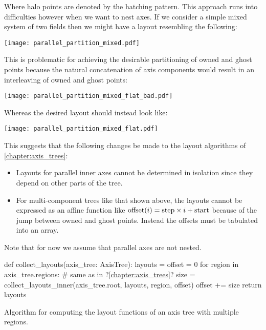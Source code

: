 \documentclass[thesis]{subfiles}
\begin{document}
Where halo points are denoted by the hatching pattern.
This approach runs into difficulties however when we want to nest axes.
If we consider a simple mixed system of two fields then we might have a layout resembling the following:

\begin{center}
  \texttt{[image: parallel\_partition\_mixed.pdf]}
\end{center}


This is problematic for achieving the desirable partitioning of owned and ghost points because the natural concatenation of axis components would result in an interleaving of owned and ghost points:

\begin{center}
  \texttt{[image: parallel\_partition\_mixed\_flat\_bad.pdf]}
\end{center}

Whereas the desired layout should instead look like:

\begin{center}
  \texttt{[image: parallel\_partition\_mixed\_flat.pdf]}
\end{center}

This suggests that the following changes be made to the layout algorithms of \cref{chapter:axis_trees}:

\begin{itemize}
  \item
    Layouts for parallel inner axes cannot be determined in isolation since they depend on other parts of the tree.
  \item
    For multi-component trees like that shown above, the layouts cannot be expressed as an affine function like $\textnormal{offset}(i) = \textnormal{step} \times i + \textnormal{start}$ because of the jump between owned and ghost points.
    Instead the offsets must be tabulated into an array.
\end{itemize}

Note that for now we assume that parallel axes are not nested.

\begin{algorithm}
  \begin{center}
    \begin{minipage}{.9\textwidth}
      \begin{pyalg2}
        def collect_layouts(axis_tree: AxisTree):
          layouts = {}
          offset = 0
          for region in axis_tree.regions:
            # same as in ?\cref{chapter:axis_trees}?
            size = collect_layouts_inner(axis_tree.root, layouts, region, offset)
            offset += size
          return layouts
      \end{pyalg2}
    \end{minipage}
  \end{center}

  \caption{
    Algorithm for computing the layout functions of an axis tree with multiple regions.
  }
  \label{alg:collect_layouts_parallel}
\end{algorithm}
\end{document}
